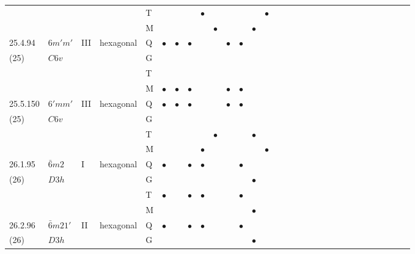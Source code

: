 \documentclass[fleqn,9pt,landscape]{jsarticle}
\begin{document}
\begin{longtable}{lllll|l|l|l|l|l|l|l|l|l|ll|ll|ll|ll|ll|ll|ll|ll}
 &  &  &  & T &  &  &  & $\bullet$ &  &  &  &  & $\bullet$ &  &  &  &  &  &  &  &  &  &  &  &  &  &  &  &  \\
 &  &  &  & M &  &  &  &  & $\bullet$ &  &  & $\bullet$ &  &  &  &  &  &  &  &  &  &  &  &  &  &  &  &  &  \\ \hline
25.4.94 & \texttt{$6m'm'$} & III & hexagonal & Q & $\bullet$ & $\bullet$ & $\bullet$ &  &  & $\bullet$ & $\bullet$ &  &  &  &  &  &  &  &  &  &  &  &  &  &  &  &  &  &  \\
(25) & $C6v$ &  &  & G &  &  &  &  &  &  &  &  &  &  &  &  &  &  &  &  &  &  &  &  &  &  &  &  &  \\
 &  &  &  & T &  &  &  &  &  &  &  &  &  &  &  &  &  &  &  &  &  &  &  &  &  &  &  &  &  \\
 &  &  &  & M & $\bullet$ & $\bullet$ & $\bullet$ &  &  & $\bullet$ & $\bullet$ &  &  &  &  &  &  &  &  &  &  &  &  &  &  &  &  &  &  \\ \hline
25.5.150 & \texttt{$6'mm'$} & III & hexagonal & Q & $\bullet$ & $\bullet$ & $\bullet$ &  &  & $\bullet$ & $\bullet$ &  &  &  &  &  &  &  &  &  &  &  &  &  &  &  &  &  &  \\
(25) & $C6v$ &  &  & G &  &  &  &  &  &  &  &  &  &  &  &  &  &  &  &  &  &  &  &  &  &  &  &  &  \\
 &  &  &  & T &  &  &  &  & $\bullet$ &  &  & $\bullet$ &  &  &  &  &  &  &  &  &  &  &  &  &  &  &  &  &  \\
 &  &  &  & M &  &  &  & $\bullet$ &  &  &  &  & $\bullet$ &  &  &  &  &  &  &  &  &  &  &  &  &  &  &  &  \\ \hline
26.1.95 & \texttt{$\bar{6}m2$} & I & hexagonal & Q & $\bullet$ &  & $\bullet$ & $\bullet$ &  &  & $\bullet$ &  &  &  &  &  &  &  &  &  &  &  &  &  &  &  &  &  &  \\
(26) & $D3h$ &  &  & G &  &  &  &  &  &  &  & $\bullet$ &  &  &  &  &  &  &  &  &  &  &  &  &  &  &  &  &  \\
 &  &  &  & T & $\bullet$ &  & $\bullet$ & $\bullet$ &  &  & $\bullet$ &  &  &  &  &  &  &  &  &  &  &  &  &  &  &  &  &  &  \\
 &  &  &  & M &  &  &  &  &  &  &  & $\bullet$ &  &  &  &  &  &  &  &  &  &  &  &  &  &  &  &  &  \\ \hline
26.2.96 & \texttt{$\bar{6}m21'$} & II & hexagonal & Q & $\bullet$ &  & $\bullet$ & $\bullet$ &  &  & $\bullet$ &  &  &  &  &  &  &  &  &  &  &  &  &  &  &  &  &  &  \\
(26) & $D3h$ &  &  & G &  &  &  &  &  &  &  & $\bullet$ &  &  &  &  &  &  &  &  &  &  &  &  &  &  &  &  &  \\

\end{longtable}
\end{document}
